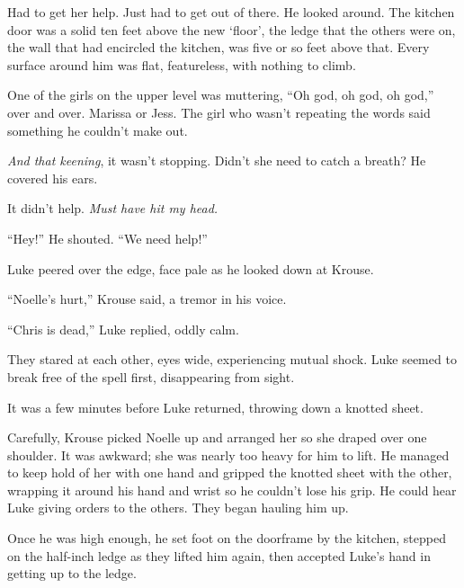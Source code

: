 Had to get her help.  Just had to get out of there.  He looked around.  The kitchen door was a solid ten feet above the new `floor', the ledge that the others were on, the wall that had encircled the kitchen, was five or so feet above that.  Every surface around him was flat, featureless, with nothing to climb.



One of the girls on the upper level was muttering, ``Oh god, oh god, oh god,'' over and over.    Marissa or Jess.  The girl who wasn't repeating the words said something he couldn't make out.



\emph{And that keening}, it wasn't stopping.  Didn't she need to catch a breath?  He covered his ears.



It didn't help.  \emph{Must have hit my head.}



``Hey!''  He shouted.  ``We need help!''



Luke peered over the edge, face pale as he looked down at Krouse.



``Noelle's hurt,'' Krouse said, a tremor in his voice.



``Chris is dead,'' Luke replied, oddly calm.



They stared at each other, eyes wide, experiencing mutual shock.  Luke seemed to break free of the spell first, disappearing from sight.



It was a few minutes before Luke returned, throwing down a knotted sheet.



Carefully, Krouse picked Noelle up and arranged her so she draped over one shoulder.  It was awkward; she was nearly too heavy for him to lift.  He managed to keep hold of her with one hand and gripped the knotted sheet with the other, wrapping it around his hand and wrist so he couldn't lose his grip.  He could hear Luke giving orders to the others.  They began hauling him up.



Once he was high enough, he set foot on the doorframe by the kitchen, stepped on the half-inch ledge as they lifted him again, then accepted Luke's hand in getting up to the ledge.



